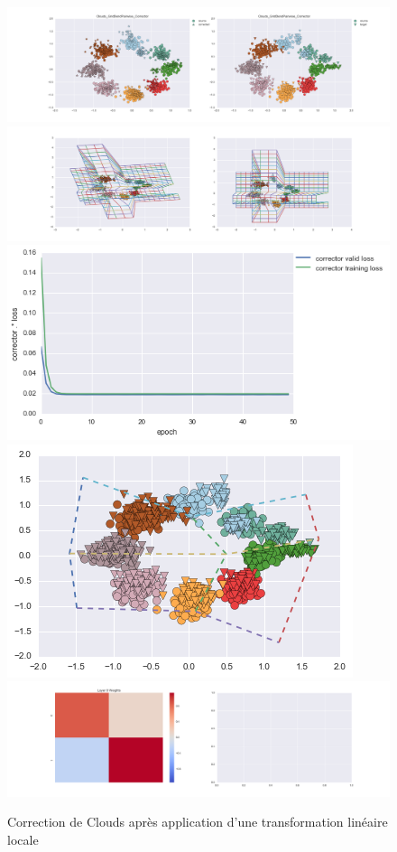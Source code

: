 \begin{figure}[H] %
\centering
\includegraphics[width=\linewidth]{fig/24-05-2016/clouds/Clouds_GridBendPairwise_Corrector-DATA.png}
\includegraphics[width=\linewidth]{fig/24-05-2016/clouds/Clouds_GridBendPairwise_Corrector-GridCheck.png}
\includegraphics[width=0.45\linewidth]{fig/24-05-2016/clouds/Clouds_GridBendPairwise_Corrector-Learning_curve.png}
\includegraphics[width=0.45\linewidth]{fig/24-05-2016/clouds/cloud_grid.png}
\includegraphics[width=\linewidth]{fig/24-05-2016/clouds/Clouds_GridBendPairwise_Corrector-W.png}
\caption{Correction de Clouds après application d'une transformation linéaire locale}
\label{fig:recap-clouds-GridBend-pairwise}
\end{figure}

